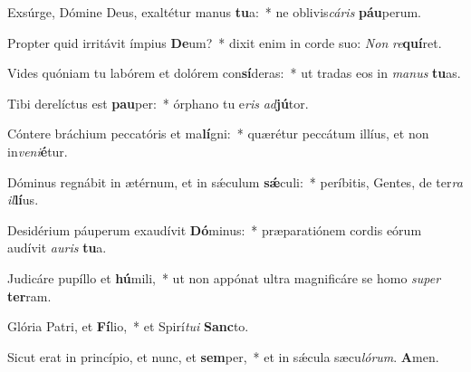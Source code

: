 \item Exsúrge, Dómine Deus, exaltétur manus \textbf{tu}a:~* ne oblivis\textit{cá}\textit{ris} \textbf{páu}perum.
\item Propter quid irritávit ímpius \textbf{De}um?~* dixit enim in corde suo: \textit{Non} \textit{re}\textbf{quí}ret.
\item Vides quóniam tu labórem et dolórem con\textbf{sí}deras:~* ut tradas eos in \textit{ma}\textit{nus} \textbf{tu}as.
\item Tibi derelíctus est \textbf{pau}per:~* órphano tu e\textit{ris} \textit{ad}\textbf{jú}tor.
\item Cóntere bráchium peccatóris et ma\textbf{lí}gni:~* quærétur peccátum illíus, et non in\textit{ve}\textit{ni}\textbf{é}tur.
\item Dóminus regnábit in ætérnum, et in sǽculum \textbf{sǽ}culi:~* períbitis, Gentes, de ter\textit{ra} \textit{il}\textbf{lí}us.
\item Desidérium páuperum exaudívit \textbf{Dó}minus:~* præparatiónem cordis eórum audívit \textit{au}\textit{ris} \textbf{tu}a.
\item Judicáre pupíllo et \textbf{hú}mili,~* ut non appónat ultra magnificáre se homo \textit{su}\textit{per} \textbf{ter}ram.
\item Glória Patri, et \textbf{Fí}lio,~* et Spirí\textit{tu}\textit{i} \textbf{Sanc}to.
\item Sicut erat in princípio, et nunc, et \textbf{sem}per,~* et in sǽcula sæcu\textit{ló}\textit{rum}. \textbf{A}men.
